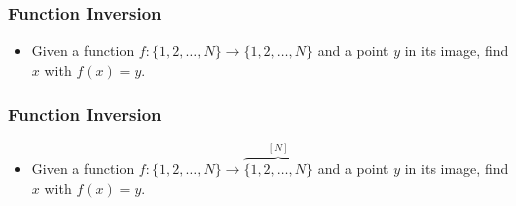 \documentclass[usenames, dvipsnames, t, table]{beamer}
\newcommand{\halfpoints}[1]{
    \node[roundnode] (1) at (#1, 0) {1};
    \node[roundnode, anchor=north] (2) at (1.south) {2};
    \node[roundnode, below=0.3cm] (3) at (2.south) {74};
    \path (2) -- node[auto=false]{\small{\vdots}} (3);
    \node[roundnode, below=0.3cm] (4) at (3.south) {$N$};
    \path (3) -- node[auto=false]{\small{\vdots}} (4);
    \node[roundnode, below=0.3cm] (3) at (2.south) {74};
    \node[roundnode, below=0.3cm] (4) at (3.south) {$N$};

    }
\begin{document}
\begin{frame}
  \frametitle{Function Inversion}
  \begin{itemize}
  \item Given a function $f: \{1, 2, \dots, N\} \to \{1, 2, \dots, N\}$ and a point $y$ in its image, find $x$ with $f(x) = y$.
  \end{itemize}
\end{frame}

\begin{frame}
  \frametitle{Function Inversion}
  \vspace{-0.45cm}
  \begin{itemize}
  \item Given a function $f: \{1, 2, \dots, N\} \to \overbrace{\{1, 2, \dots, N\}}^{[N]}$ and a point $y$ in its image, find $x$ with $f(x) = y$.
  \end{itemize}
  \pause
  \hspace{5em}
  \scalebox{0.8}{
    \begin{tikzpicture}[roundnode/.style={circle, draw=green!60, fill=green!5, very thick, minimum size=3mm}]







\end{tikzpicture}}
\end{frame}
\end{document}
